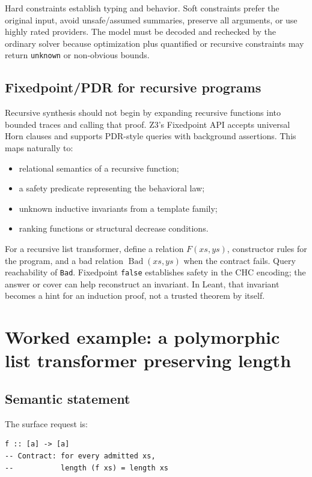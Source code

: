 \documentclass[11pt,oneside]{article}
\newcommand{\code}[1]{\texttt{#1}}
\begin{document}
Hard constraints establish typing and behavior. Soft constraints prefer the original
input, avoid unsafe/assumed summaries, preserve all arguments, or use highly rated
providers. The model must be decoded and rechecked by the ordinary solver because
optimization plus quantified or recursive constraints may return \code{unknown} or
non-obvious bounds.

\subsection{Fixedpoint/PDR for recursive programs}

Recursive synthesis should not begin by expanding recursive functions into bounded
traces and calling that proof. Z3's Fixedpoint API accepts universal Horn clauses and
supports PDR-style queries with background assertions. This maps naturally to:

\begin{itemize}
  \item relational semantics of a recursive function;
  \item a safety predicate representing the behavioral law;
  \item unknown inductive invariants from a template family;
  \item ranking functions or structural decrease conditions.
\end{itemize}

For a recursive list transformer, define a relation
$F(xs,ys)$, constructor rules for the program, and a bad relation
$\operatorname{Bad}(xs,ys)$ when the contract fails. Query reachability of
\code{Bad}. Fixedpoint \code{false} establishes safety in the CHC encoding; the answer
or cover can help reconstruct an invariant. In Leant, that invariant becomes a hint for
an induction proof, not a trusted theorem by itself.

\section{Worked example: a polymorphic list transformer preserving length}
\label{sec:length-example}

\subsection{Semantic statement}

The surface request is:

\begin{lstlisting}[language=HaskellExt]
f :: [a] -> [a]
-- Contract: for every admitted xs,
--           length (f xs) = length xs
\end{lstlisting}
\end{document}
